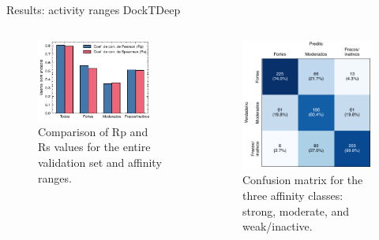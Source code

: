 \documentclass[aspectratio=169,xcolor=dvipsnames]{beamer}
\begin{document}
\begin{frame}{Results: activity ranges \hfill {\footnotesize \alert{DockTDeep}}}
    \begin{columns}[c]
        \begin{figure}
            \centering
            \includegraphics[width=0.9\textwidth]{imgs/results/correlations-in-range-2.pdf}
            \caption{Comparison of Rp and Rs values for the entire validation set and affinity ranges.}
        \end{figure}

        \begin{figure}
            \centering
            \includegraphics[width=.85\textwidth]{imgs/results/confusion-matrix.pdf}
            \caption{Confusion matrix for the three affinity classes: strong, moderate, and weak/inactive.}
        \end{figure}
    \end{columns}
\end{frame}
\end{document}
